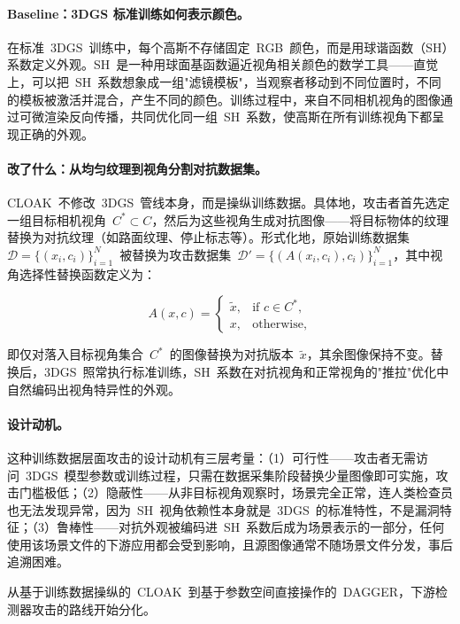 \paragraph{Baseline：3DGS 标准训练如何表示颜色。}
在标准~3DGS~训练中，每个高斯不存储固定~RGB~颜色，而是用球谐函数（SH）系数定义外观。SH~是一种用球面基函数逼近视角相关颜色的数学工具——直觉上，可以把~SH~系数想象成一组"滤镜模板"，当观察者移动到不同位置时，不同的模板被激活并混合，产生不同的颜色。训练过程中，来自不同相机视角的图像通过可微渲染反向传播，共同优化同一组~SH~系数，使高斯在所有训练视角下都呈现正确的外观。

\paragraph{改了什么：从均匀纹理到视角分割对抗数据集。}
CLOAK~不修改~3DGS~管线本身，而是操纵训练数据。具体地，攻击者首先选定一组目标相机视角~$C^* \subset C$，然后为这些视角生成对抗图像——将目标物体的纹理替换为对抗纹理（如路面纹理、停止标志等）。形式化地，原始训练数据集~$\mathcal{D} = \{(x_i, c_i)\}_{i=1}^N$~被替换为攻击数据集~$\mathcal{D}' = \{(A(x_i, c_i), c_i)\}_{i=1}^N$，其中视角选择性替换函数定义为：

\begin{equation}
    A(x, c) =
    \begin{cases}
        \tilde{x}, & \text{if } c \in C^*, \\
        x, & \text{otherwise},
    \end{cases}
\end{equation}

即仅对落入目标视角集合~$C^*$~的图像替换为对抗版本~$\tilde{x}$，其余图像保持不变。替换后，3DGS~照常执行标准训练，SH~系数在对抗视角和正常视角的"推拉"优化中自然编码出视角特异性的外观。

\paragraph{设计动机。}
这种训练数据层面攻击的设计动机有三层考量：（1）可行性——攻击者无需访问~3DGS~模型参数或训练过程，只需在数据采集阶段替换少量图像即可实施，攻击门槛极低；（2）隐蔽性——从非目标视角观察时，场景完全正常，连人类检查员也无法发现异常，因为~SH~视角依赖性本身就是~3DGS~的标准特性，不是漏洞特征；（3）鲁棒性——对抗外观被编码进~SH~系数后成为场景表示的一部分，任何使用该场景文件的下游应用都会受到影响，且源图像通常不随场景文件分发，事后追溯困难。

从基于训练数据操纵的~CLOAK~到基于参数空间直接操作的~DAGGER，下游检测器攻击的路线开始分化。


